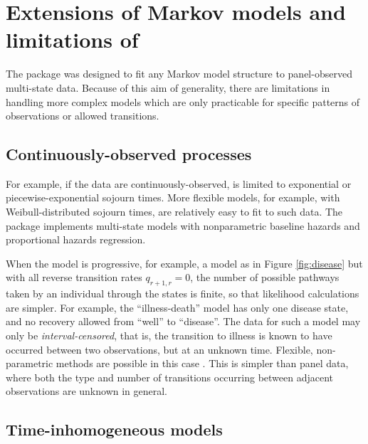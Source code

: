 \documentclass[article,shortnames]{jss}
\begin{document}
\section[Extensions of Markov models and limitations of msm]{Extensions of Markov models and limitations of }
\label{sec:limitations}

The  package was designed to fit any Markov model structure
to panel-observed multi-state data.  Because of this aim of
generality, there are limitations in handling more complex models
which are only practicable for specific patterns of observations or
allowed transitions.
\subsection{Continuously-observed processes}
For example, if the data are continuously-observed,  is
limited to exponential or piecewise-exponential sojourn times.  More
flexible models, for example, with Weibull-distributed sojourn times,
are relatively easy to fit to such data. The  package
\citep{mstate:jss,i07} implements multi-state models with nonparametric
baseline hazards and proportional hazards regression.

When the model is progressive, for example, a model as in Figure
\ref{fig:disease} but with all reverse transition rates $q_{r+1,r}=0$,
the number of possible pathways taken by an individual through the
states is finite, so that likelihood calculations are simpler.  For
example, the ``illness-death'' model has only one disease state, and
no recovery allowed from ``well'' to ``disease''.  The data for such a
model may only be \emph{interval-censored}, that is, the transition to
illness is known to have occurred between two observations, but at an
unknown time.  Flexible, non-parametric methods are possible in this
case \citep{frydman1995nem,frydman2008nem}.  This is simpler than
panel data, where both the type and number of transitions occurring
between adjacent observations are unknown in general.

\subsection{Time-inhomogeneous models}
\end{document}
